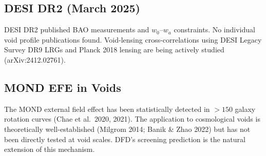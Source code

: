 \documentclass[11pt,a4paper]{article}
\begin{document}
\subsection*{DESI DR2 (March 2025)}

DESI DR2 published BAO measurements and $w_0$--$w_a$ constraints.
No individual void profile publications found. Void-lensing
cross-correlations using DESI Legacy Survey DR9 LRGs and Planck
2018 lensing are being actively studied (arXiv:2412.02761).

\subsection*{MOND EFE in Voids}

The MOND external field effect has been statistically detected in
$> 150$ galaxy rotation curves (Chae et al.\ 2020, 2021). The
application to cosmological voids is theoretically well-established
(Milgrom 2014; Banik \& Zhao 2022) but has not been directly
tested at void scales. DFD's screening prediction is the natural
extension of this mechanism.
\end{document}

